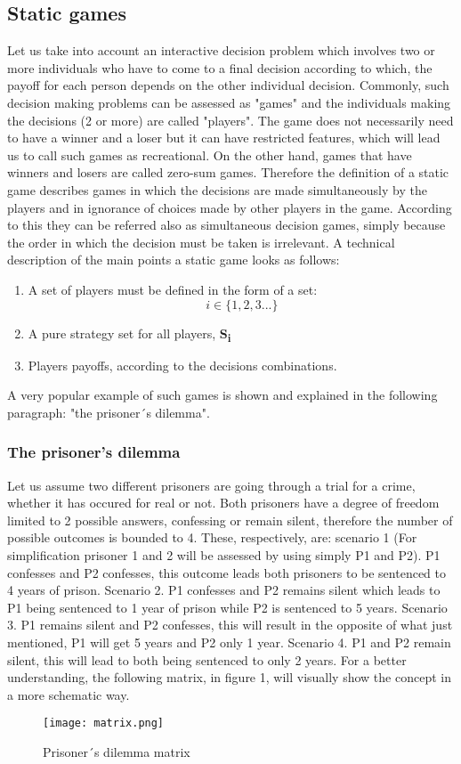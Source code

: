 \documentclass[conference]{IEEEtran}
\begin{document}
\subsection{Static games}
Let us take into account an interactive decision problem which involves two or more individuals who have to come to a final decision according to which, the payoff for each person depends on the other individual decision. Commonly, such decision making problems can be assessed as "games" and the individuals making the decisions (2 or more) are called "players". The game does not necessarily need to have a winner and a loser but it can have restricted features, which will lead us to call such games as recreational. On the other hand, games
that have winners and losers are called zero-sum games. 
Therefore the definition of a static game describes games in which the decisions are made simultaneously by the players and in ignorance of choices made by other players in the game. According to this they can be referred also as simultaneous decision games, simply because the order in which the decision must be taken is irrelevant\cite{b3}. A technical description of the main points a static game looks as follows:
\begin{enumerate}
  \item A set of players must be defined in the form of a set: \[i\in       \{1,2,3...\}\]
  \item A pure strategy set for all players, \textbf{S{\textsubscript{i}}}
  \item Players payoffs, according to the decisions combinations.
\end{enumerate} 
A very popular example of such games is shown and explained in the following paragraph: "the prisoner´s dilemma"\cite{b4}.
\subsubsection{The prisoner's dilemma}
Let us assume two different prisoners are going through a trial for a crime, whether it has occured for real or not. Both prisoners have a degree of freedom limited to 2 possible answers, confessing or remain silent, therefore the number of possible outcomes is bounded to 4. These, respectively, are: scenario 1 (For simplification prisoner 1 and 2 will be assessed by using simply P1 and P2). P1 confesses and P2 confesses, this outcome leads both prisoners to be sentenced to 4 years of prison. Scenario 2. P1 confesses and P2 remains silent which leads to P1 being sentenced to 1 year of prison while P2 is sentenced to 5 years. Scenario 3. P1 remains silent and P2 confesses, this will result in the opposite of what just mentioned, P1 will get 5 years and P2 only 1 year. Scenario 4. P1 and P2 remain silent, this will lead to both being sentenced to only 2 years. For a better understanding, the following matrix, in figure 1, will visually show the concept in a more schematic way.
\begin{figure}[h]
    \centerline{\texttt{[image: matrix.png]}}
    \caption{Prisoner´s dilemma matrix \cite{b5}}
    \label{pdmatrix}
\end{figure}
\end{document}
